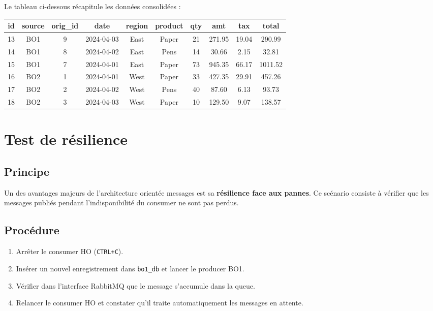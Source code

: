 \documentclass[a4paper,12pt]{article}
\begin{document}
Le tableau ci-dessous récapitule les données consolidées :

\begin{center}
\small
\begin{tabular}{|c|c|c|c|c|c|c|c|c|c|}
\hline
\textbf{id} & \textbf{source} & \textbf{orig\_id} & \textbf{date} & \textbf{region} & \textbf{product} & \textbf{qty} & \textbf{amt} & \textbf{tax} & \textbf{total} \\
\hline
13 & BO1 & 9 & 2024-04-03 & East & Paper & 21 & 271.95 & 19.04 & 290.99 \\
14 & BO1 & 8 & 2024-04-02 & East & Pens & 14 & 30.66 & 2.15 & 32.81 \\
15 & BO1 & 7 & 2024-04-01 & East & Paper & 73 & 945.35 & 66.17 & 1011.52 \\
16 & BO2 & 1 & 2024-04-01 & West & Paper & 33 & 427.35 & 29.91 & 457.26 \\
17 & BO2 & 2 & 2024-04-02 & West & Pens & 40 & 87.60 & 6.13 & 93.73 \\
18 & BO2 & 3 & 2024-04-03 & West & Paper & 10 & 129.50 & 9.07 & 138.57 \\
\hline
\end{tabular}
\end{center}

\section{Test de résilience}

\subsection{Principe}

Un des avantages majeurs de l'architecture orientée messages est sa \textbf{résilience face aux pannes}. Ce scénario consiste à vérifier que les messages publiés pendant l'indisponibilité du consumer ne sont pas perdus.

\subsection{Procédure}

\begin{enumerate}
    \item Arrêter le consumer HO (\texttt{CTRL+C}).
    \item Insérer un nouvel enregistrement dans \texttt{bo1\_db} et lancer le producer BO1.
    \item Vérifier dans l'interface RabbitMQ que le message s'accumule dans la queue.
    \item Relancer le consumer HO et constater qu'il traite automatiquement les messages en attente.
\end{enumerate}
\end{document}
